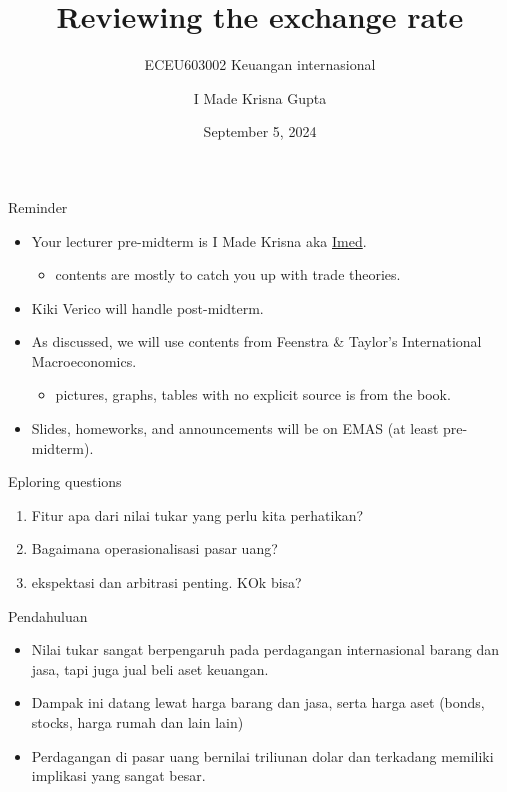 \documentclass[
  ignorenonframetext,
]{beamer}
\title{Reviewing the exchange rate}
\subtitle{ECEU603002 Keuangan internasional}
\author{I Made Krisna Gupta}
\date{September 5, 2024}
\providecommand{\tightlist}{%
  \setlength{\itemsep}{0pt}\setlength{\parskip}{0pt}}\usepackage{longtable,booktabs,array}
\begin{document}
\frame{\titlepage}

\begin{frame}{Reminder}
\label{reminder}
\begin{itemize}
\item
  Your lecturer pre-midterm is I Made Krisna aka
  \href{https://krisna.or.id}{Imed}.

  \begin{itemize}
  \tightlist
  \item
    contents are mostly to catch you up with trade theories.
  \end{itemize}
\item
  Kiki Verico will handle post-midterm.
\item
  As discussed, we will use contents from Feenstra \& Taylor's
  International Macroeconomics.

  \begin{itemize}
  \tightlist
  \item
    pictures, graphs, tables with no explicit source is from the book.
  \end{itemize}
\item
  Slides, homeworks, and announcements will be on EMAS (at least
  pre-midterm).
\end{itemize}
\end{frame}

\begin{frame}{Eploring questions}
\label{eploring-questions}
\begin{enumerate}
\tightlist
\item
  Fitur apa dari nilai tukar yang perlu kita perhatikan?
\item
  Bagaimana operasionalisasi pasar uang?
\item
  ekspektasi dan arbitrasi penting. KOk bisa?
\end{enumerate}
\end{frame}

\begin{frame}{Pendahuluan}
\label{pendahuluan}
\begin{itemize}
\item
  Nilai tukar sangat berpengaruh pada perdagangan internasional barang
  dan jasa, tapi juga jual beli aset keuangan.
\item
  Dampak ini datang lewat harga barang dan jasa, serta harga aset
  (bonds, stocks, harga rumah dan lain lain)
\item
  Perdagangan di pasar uang bernilai triliunan dolar dan terkadang
  memiliki implikasi yang sangat besar.
\end{itemize}
\end{frame}
\end{document}
